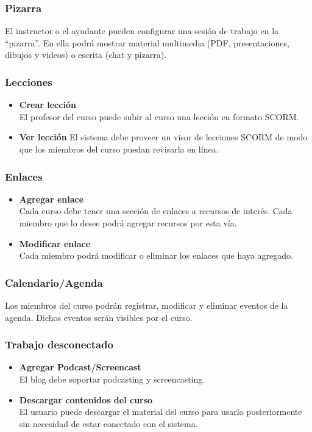 \subsubsection{Pizarra}
El instructor o el ayudante pueden configurar una sesión de trabajo en la ``pizarra''. En ella podrá mostrar material multimedia (PDF, presentaciones, dibujos y videos) o escrita (chat y pizarra).

\subsubsection{Lecciones}
\begin{itemize}
	\item \textbf{Crear lección}\\
	El profesor del curso puede subir al curso una lección en formato SCORM.
 	\item \textbf{Ver lección}
	El sistema debe proveer un visor de lecciones SCORM de modo que los miembros del curso puedan revisarla en línea.
\end{itemize}

\subsubsection{Enlaces}
\begin{itemize}
	\item \textbf{Agregar enlace}\\
	Cada curso debe tener una sección de enlaces a recursos de interés. Cada miembro que lo desee podrá agregar recursos por esta vía.
	\item \textbf{Modificar enlace}\\
	Cada miembro podrá modificar o eliminar los enlaces que haya agregado.
\end{itemize}

\subsubsection{Calendario/Agenda}
Los miembros del curso podrán registrar, modificar y eliminar eventos de la agenda. Dichos eventos serán visibles por el curso.\\

\subsubsection{Trabajo desconectado}
\begin{itemize}
	\item \textbf{Agregar Podcast/Screencast}\\
	El blog debe soportar podcasting y screencasting.
	\item \textbf{Descargar contenidos del curso}\\
	El usuario puede descargar el material del curso para usarlo posteriormente sin necesidad de estar conectado con el sistema.
\end{itemize}

